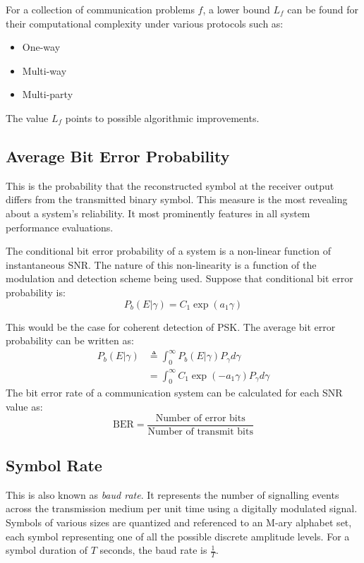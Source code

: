 For a collection of communication problems \(f\), a lower bound \(L_f\) can be found for their computational complexity under various protocols such as:
\begin{itemize}
	\item One-way
	\item Multi-way
	\item Multi-party
\end{itemize}
The value \(L_f\) points to possible algorithmic improvements.

\subsection{Average Bit Error Probability}
This is the probability that the reconstructed symbol at the receiver output differs from the transmitted binary symbol. This measure is the most revealing about a system's reliability. It most prominently features in all system performance evaluations\cite{hayk}.

The conditional bit error probability of a system is a non-linear function of instantaneous \gls{SNR}. The nature of this non-linearity is a function of the modulation and detection scheme being used\cite{dcommoha}. Suppose that conditional bit error probability is:
\[
	P_b(E|\gamma) = C_1 \exp(a_1\gamma)
\]
\begin{mathDef}
\end{mathDef}
This would be the case for coherent detection of \gls{PSK}. The average bit error probability can be written as:
\begin{align*}
	P_b(E|\gamma) &\triangleq \int_0^\infty P_b(E|\gamma)P_\gamma d\gamma \\
				  &= \int_0^\infty C_1 \exp (-a_1 \gamma)P_\gamma d\gamma
\end{align*}
The bit error rate of a communication system can be calculated for each \gls{SNR} value as:
\[
	\text{BER} = \frac{\text{Number of error bits}}{\text{Number of transmit bits}}
\]

\subsection{Symbol Rate}
This is also known as \emph{baud rate}. It represents the number of signalling events across the transmission medium per unit time using a digitally modulated signal. Symbols of various sizes are quantized and referenced to an M-ary alphabet set, each symbol representing one of all the possible discrete amplitude levels. 
For a symbol duration of \(T\) seconds, the baud rate is \(\frac{1}{T}\).

